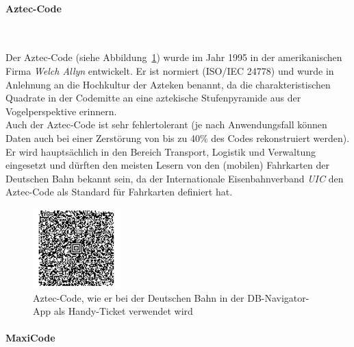 \paragraph{Aztec-Code}~

Der Aztec-Code (siehe Abbildung~\ref{fig:aztec}) wurde im Jahr 1995 in der amerikanischen Firma \textit{Welch Allyn} entwickelt.
Er ist normiert (ISO/IEC 24778) und wurde in Anlehnung an die Hochkultur der Azteken benannt, 
da die charakteristischen Quadrate in der Codemitte an eine aztekische Stufenpyramide aus der Vogelperspektive erinnern.\\ 

Auch der Aztec-Code ist sehr fehlertolerant (je nach Anwendungsfall können Daten auch bei einer Zerstörung von bis zu 40\% des Codes rekonstruiert werden). Er wird hauptsächlich in den Bereich Transport, Logistik und Verwaltung eingesetzt und dürften den meisten Lesern von den (mobilen) Fahrkarten der Deutschen Bahn bekannt sein, da der Internationale Eisenbahnverband \textit{UIC} den Aztec-Code als Standard für Fahrkarten definiert hat.\\

\begin{figure}[htbp]%
	\centering
	\includegraphics[width=0.3\textwidth]{Bilder/Aztec_Code.png} 
	\caption[Aztec-Code]{Aztec-Code, wie er bei der Deutschen Bahn in der DB-Navigator-App als Handy-Ticket verwendet wird\footnotemark}
	\label{fig:aztec}	
\end{figure}

\paragraph{MaxiCode}~


